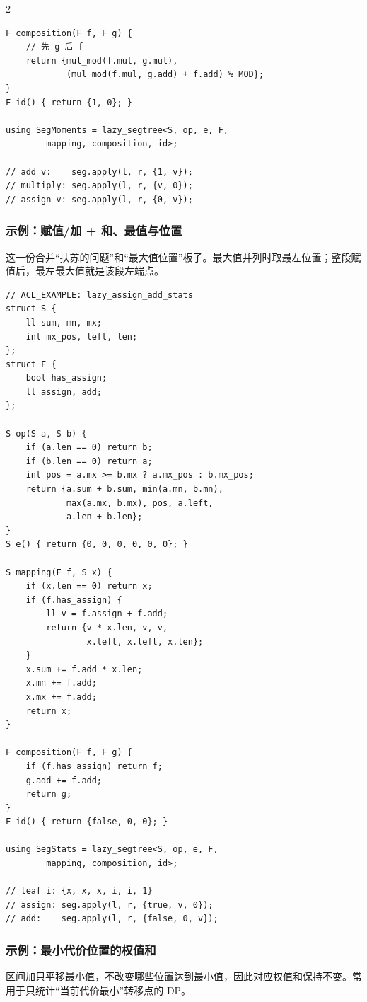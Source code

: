 \begin{multicols*}{2}
\begin{verbatim}
F composition(F f, F g) {
    // 先 g 后 f
    return {mul_mod(f.mul, g.mul),
            (mul_mod(f.mul, g.add) + f.add) % MOD};
}
F id() { return {1, 0}; }

using SegMoments = lazy_segtree<S, op, e, F,
        mapping, composition, id>;

// add v:    seg.apply(l, r, {1, v});
// multiply: seg.apply(l, r, {v, 0});
// assign v: seg.apply(l, r, {0, v});
			\end{verbatim}

			\subsubsection{示例：赋值/加 + 和、最值与位置}

			这一份合并“扶苏的问题”和“最大值位置”板子。最大值并列时取最左位置；整段赋值后，最左最大值就是该段左端点。

			\begin{verbatim}
// ACL_EXAMPLE: lazy_assign_add_stats
struct S {
    ll sum, mn, mx;
    int mx_pos, left, len;
};
struct F {
    bool has_assign;
    ll assign, add;
};

S op(S a, S b) {
    if (a.len == 0) return b;
    if (b.len == 0) return a;
    int pos = a.mx >= b.mx ? a.mx_pos : b.mx_pos;
    return {a.sum + b.sum, min(a.mn, b.mn),
            max(a.mx, b.mx), pos, a.left,
            a.len + b.len};
}
S e() { return {0, 0, 0, 0, 0, 0}; }

S mapping(F f, S x) {
    if (x.len == 0) return x;
    if (f.has_assign) {
        ll v = f.assign + f.add;
        return {v * x.len, v, v,
                x.left, x.left, x.len};
    }
    x.sum += f.add * x.len;
    x.mn += f.add;
    x.mx += f.add;
    return x;
}

F composition(F f, F g) {
    if (f.has_assign) return f;
    g.add += f.add;
    return g;
}
F id() { return {false, 0, 0}; }

using SegStats = lazy_segtree<S, op, e, F,
        mapping, composition, id>;

// leaf i: {x, x, x, i, i, 1}
// assign: seg.apply(l, r, {true, v, 0});
// add:    seg.apply(l, r, {false, 0, v});
			\end{verbatim}

			\subsubsection{示例：最小代价位置的权值和}

			区间加只平移最小值，不改变哪些位置达到最小值，因此对应权值和保持不变。常用于只统计“当前代价最小”转移点的 DP。


\end{multicols*}
